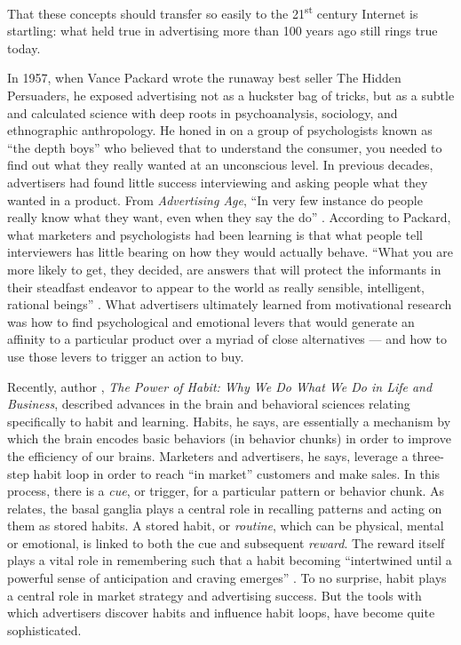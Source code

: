 That these concepts should transfer so easily to the  21\textsuperscript{st}  century Internet is startling: what held true in advertising more than 100 years ago still rings true today.

In 1957, when Vance Packard wrote the runaway best seller The Hidden Persuaders, he exposed advertising not as a huckster bag of tricks, but as a subtle and calculated science with deep roots in psychoanalysis, sociology, and ethnographic anthropology. He honed in on a group of psychologists known as ``the depth boys'' who believed that to understand the consumer, you needed to find out what they really wanted at an unconscious level. In previous decades, advertisers had found little success interviewing and asking people what they wanted in a product. From \emph{Advertising Age}, ``In very few instance do people really know what they want, even when they say the do''  \citep[as cited in][p. 37]{Packard:1957vs}.  According to Packard, what marketers and psychologists had been learning is that what people tell interviewers has little bearing on how they would actually behave. ``What you are more likely to get, they decided, are answers that will protect the informants in their steadfast endeavor to appear to the world as really sensible, intelligent, rational beings''  \citep[p. 35]{Packard:1957vs}.  What advertisers ultimately learned from motivational research was how to find psychological and emotional levers that would generate an affinity to a particular product over a myriad of close alternatives --- and how to use those levers to trigger an action to buy.

Recently, author  \cite{Duhigg:2012uk},  \emph{The Power of Habit: Why We Do What We Do in Life and Business}, described advances in the brain and behavioral sciences relating specifically to habit and learning. Habits, he says, are essentially a mechanism by which the brain encodes basic behaviors (in behavior chunks) in order to improve the efficiency of our brains. Marketers and advertisers, he says, leverage a three-step habit loop in order to reach ``in market'' customers and make sales. In this process, there is a \emph{cue}, or trigger, for a particular pattern or behavior chunk. As  \cite{Duhigg:2012uk}  relates, the basal ganglia plays a central role in recalling patterns and acting on them as stored habits. A stored habit, or \emph{routine}, which can be physical, mental or emotional, is linked to both the cue and subsequent \emph{reward}. The reward itself plays a vital role in remembering such that a habit becoming ``intertwined until a powerful sense of anticipation and craving emerges''  \citep[p. 19]{Duhigg:2012uk}.  To no surprise, habit plays a central role in market strategy and advertising success. But the tools with which advertisers discover habits and influence habit loops, have become quite sophisticated.

